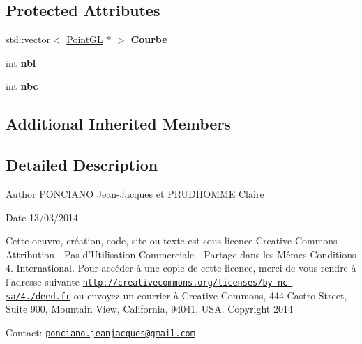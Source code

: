 \subsection*{Protected Attributes}
\begin{DoxyCompactItemize}
\item 
\hypertarget{classSurface_a5ae7589a4557f13f679c7ed61ab6887e}{std\-::vector$<$ \hyperlink{classPointGL}{Point\-G\-L} $\ast$ $>$ {\bfseries Courbe}}\label{classSurface_a5ae7589a4557f13f679c7ed61ab6887e}

\item 
\hypertarget{classSurface_a1076295f2fc1c261f431faa6839e6528}{int {\bfseries nbl}}\label{classSurface_a1076295f2fc1c261f431faa6839e6528}

\item 
\hypertarget{classSurface_a27f163ee8df16552c164d3661be1578b}{int {\bfseries nbc}}\label{classSurface_a27f163ee8df16552c164d3661be1578b}

\end{DoxyCompactItemize}
\subsection*{Additional Inherited Members}


\subsection{Detailed Description}
\begin{DoxyAuthor}{Author}
P\-O\-N\-C\-I\-A\-N\-O Jean-\/\-Jacques et P\-R\-U\-D\-H\-O\-M\-M\-E Claire 
\end{DoxyAuthor}
\begin{DoxyDate}{Date}
13/03/2014
\end{DoxyDate}
Cette oeuvre, création, code, site ou texte est sous licence Creative Commons Attribution -\/ Pas d’\-Utilisation Commerciale -\/ Partage dans les Mêmes Conditions 4. International. Pour accéder à une copie de cette licence, merci de vous rendre à l'adresse suivante \href{http://creativecommons.org/licenses/by-nc-sa/4.0/deed.fr}{\tt http\-://creativecommons.\-org/licenses/by-\/nc-\/sa/4./deed.\-fr} ou envoyez un courrier à Creative Commons, 444 Castro Street, Suite 900, Mountain View, California, 94041, U\-S\-A. Copyright 2014

Contact\-: \href{mailto:ponciano.jeanjacques@gmail.com}{\tt ponciano.\-jeanjacques@gmail.\-com} 

